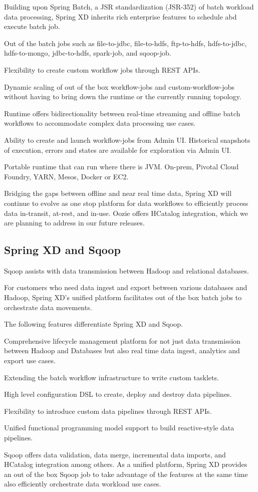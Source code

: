\begin{itemize*}
\item Building upon Spring Batch, a JSR standardization (JSR-352) of batch workload data processing, Spring XD inherits rich enterprise features to schedule abd execute batch job.
\item Out of the batch jobs such as file-to-jdbc, file-to-hdfs, ftp-to-hdfs, hdfs-to-jdbc, hdfs-to-mongo, jdbc-to-hdfs, spark-job, and sqoop-job.
\item Flexibility to create custom workflow jobs through REST APIs.
\item Dynamic scaling of out of the box workflow-jobs and custom-workflow-jobs without having to bring down the runtime or the currently running topology.
\item Runtime offers bidirectionality between real-time streaming and offline batch workflows to accommodate complex data processing use cases.
\item Ability to create and launch workflow-jobs from Admin UI. Historical snapshots of execution, errors and states are available for exploration via Admin UI.
\item Portable runtime that can run where there is JVM. On-prem, Pivotal Cloud Foundry, YARN, Mesos, Docker or EC2.
\end{itemize*}

Bridging the gaps between offline and near real time data, Spring XD will continue to evolve as one stop platform for data workflows to efficiently process data in-transit, at-rest, and in-use. Oozie offers HCatalog integration, which we are planning to address in our future releases.

\subsection{Spring XD and Sqoop}
Sqoop assists with data transmission between Hadoop and relational databases.

For customers who need data ingest and export between various databases and Hadoop, Spring XD's unified platform facilitates out of the box batch jobs to orchestrate data movements. 

The following features differentiate Spring XD and Sqoop.

\begin{itemize*}
\item Comprehensive lifecycle management platform for not just data transmission between Hadoop and Databases but also real time data ingest, analytics and export use cases.
\item Extending the batch workflow infrastructure to write custom tasklets.
\item High level configuration DSL to create, deploy and destroy data pipelines.
\item Flexibility to introduce custom data pipelines through REST APIs.
\item Unified functional programming model support to build reactive-style data pipelines.
\end{itemize*}

Sqoop offers data validation, data merge, incremental data imports, and HCatalog integration among others. As a unified platform, Spring XD provides an out of the box Sqoop job to take advantage of the features at the same time also efficiently orchestrate data workload use cases. 
